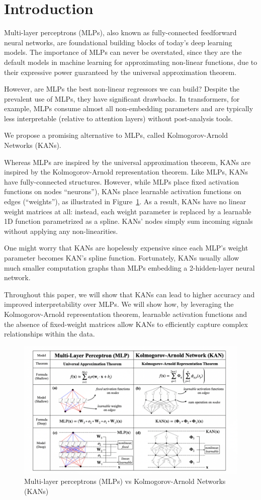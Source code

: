 \section{Introduction}
\label{sec:in}
Multi-layer perceptrons (MLPs), also known as fully-connected feedforward neural networks, are foundational building blocks of today’s deep learning models. The importance of MLPs can never be overstated, since they are the default models in machine learning for approximating non-linear functions, due to their expressive power guaranteed by the universal approximation theorem. 

However, are MLPs the best non-linear regressors we can build? Despite the prevalent use of MLPs, they have significant drawbacks. In transformers, for example, MLPs consume almost all non-embedding parameters and are typically less interpretable (relative to attention layers) without post-analysis tools.

We propose a promising alternative to MLPs, called Kolmogorov-Arnold Networks (KANs). 

Whereas MLPs are inspired by the universal approximation theorem, KANs are inspired by the Kolmogorov-Arnold representation theorem. Like MLPs, KANs have fully-connected structures. However, while MLPs place fixed activation functions on nodes “neurons”), KANs place learnable activation functions on edges (“weights”), as illustrated in Figure~\ref{fig:MLPKAN}. As a result, KANs have no linear weight matrices at all: instead, each weight parameter is replaced by a learnable 1D function parametrized as a spline. KANs’ nodes simply sum incoming signals without applying any non-linearities. 

One might worry that KANs are hopelessly expensive since each MLP’s weight parameter becomes KAN’s spline function. Fortunately, KANs usually allow much smaller computation graphs than MLPs embedding a 2-hidden-layer neural network.

Throughout this paper, we will show that KANs can lead to higher accuracy and improved interpretability over MLPs. We will show how, by leveraging the Kolmogorov-Arnold representation theorem, learnable activation functions and the absence of fixed-weight matrices allow KANs to efficiently capture complex relationships within the data\cite{KAN}.

\begin{figure}[H]
    \centering
    \includegraphics[width=0.8\linewidth]{Images/MLP-KAN.png}
    \caption{Multi-layer perceptrons (MLPs) vs Kolmogorov-Arnold Networks (KANs)}
    \label{fig:MLPKAN}
\end{figure}